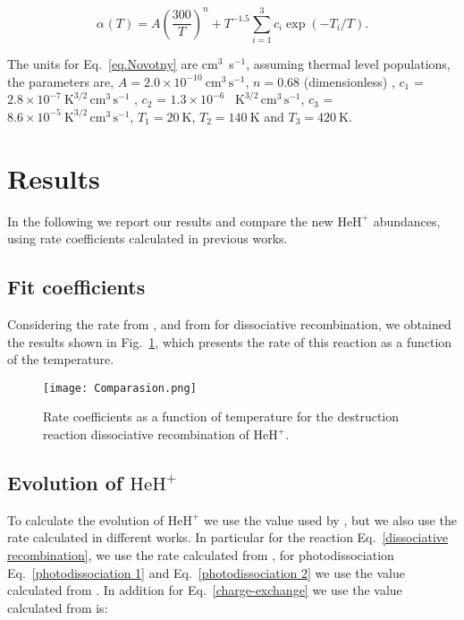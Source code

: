 \documentclass[baaa]{baaa}
\begin{document}
 \begin{equation}\label{eq.Novotny}
         \alpha_{}(T)= A \left(\frac{300}{T}\right)^n + T^{-1.5} \sum_{i=1}^3 c_i \exp(-T_i/T).
     \end{equation} 

The units for Eq.~\ref{eq.Novotny} are cm$^3$~s$^{-1}$, assuming thermal level populations, the parameters are, $A =2.0 \times 10^{-10}~\mathrm{cm^3 \, s^{-1}}$, $n=0.68$ (dimensionless) ,  $c_1$ =$2.8 \times 10^{-7}~\mathrm{K^{3/2} \, cm^3\, s^{-1}}$ , $c_2$ = $1.3 \times 10^{-6}$~ $\mathrm{K^{3/2} \, cm^3\, s^{-1}}$, $c_3$ = $8.6 \times 10^{-5}~\mathrm{K^{3/2} \, cm^3\, s^{-1}}$, $T_1 = 20 ~\mathrm{K}$, $T_2 = 140~\mathrm{K}$ and $T_3 = 420~\mathrm{K}$. 


\section{Results}

 In the following we report our results and compare the new $\mathrm{HeH^+}$ abundances, using rate coefficients calculated in previous works.
 

\subsection{Fit coefficients}

Considering the rate from \citet{GP98}, \citet{Stancil1998} and from \citet{Novotny2019} for dissociative recombination, we obtained the results shown in Fig.~\ref{Comparasion}, which presents the rate of this reaction as a function of the temperature. 
\begin{figure}[h!]
  \centering
   \texttt{[image: Comparasion.png]}
\caption{Rate coefficients as a function of temperature for the destruction reaction dissociative recombination of $\mathrm{HeH^+}$.}
    \label{Comparasion}
\end{figure}

\subsection{Evolution of $\mathrm{HeH^+}$}

To calculate the evolution of $\mathrm{HeH^+}$ we use the value used by \citet{Schleicher2008}, but we also use the rate calculated in different works. In particular for the reaction Eq.~\ref{dissociative recombination}, we use the rate calculated from \citet{Novotny2019}, for photodissociation Eq.~\ref{photodissociation 1} and  Eq.~\ref{photodissociation 2} we use the value calculated from \citet{Coppola2017}. In addition for Eq.~\ref{charge-exchange} we use the value calculated from \citet{Bovino2011} is:  
\end{document}
